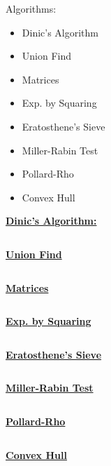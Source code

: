 \documentclass{article}
\newcommand{\algo}[1]{\underline{\Large{\textbf{#1}}}}
\begin{document}
\begin{multicols*}{2}
	
	Algorithms:
	\begin{itemize}
		\item Dinic's Algorithm
		\item Union Find
		\item Matrices
		\item Exp. by Squaring
		\item Eratosthene's Sieve
		\item Miller-Rabin Test
		\item Pollard-Rho
		\item Convex Hull
	\end{itemize}

	\algo{Dinic's Algorithm:}
	\inputminted[breaklines=true]{python}{algorithms/dinics.py}

	\algo{Union Find}
	\inputminted[breaklines=true]{python}{algorithms/unionfind.py}

	\algo{Matrices}
	\inputminted[breaklines=true]{python}{algorithms/matrix.py}

	\algo{Exp. by Squaring}
	\inputminted[breaklines=true]{python}{algorithms/exp.py}

	\algo{Eratosthene's Sieve}
	\inputminted[breaklines=true]{python}{algorithms/sieve.py}

	\algo{Miller-Rabin Test}
	\inputminted[breaklines=true]{python}{algorithms/millerrabin.py}

	\algo{Pollard-Rho}
	\inputminted[breaklines=true]{python}{algorithms/pollardrho.py}

	\algo{Convex Hull}
	\inputminted[breaklines=true]{python}{algorithms/convexhull.py}

\end{multicols*}
\end{document}
